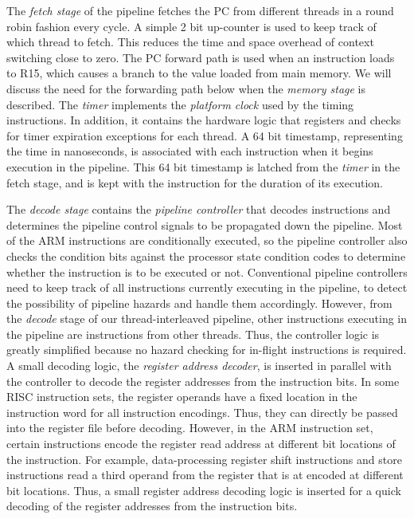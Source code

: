 The \emph{fetch stage} of the pipeline fetches the PC from different threads in a round robin fashion every cycle.
A simple 2 bit up-counter is used to keep track of which thread to fetch.
This reduces the time and space overhead of context switching close to zero. 
The PC forward path is used when an instruction loads to R15, which causes a branch to the value loaded from main memory.  
We will discuss the need for the forwarding path below when the \emph{memory stage} is described.
The \emph{timer} implements the \emph{platform clock} used by the timing instructions.
In addition, it contains the hardware logic that registers and checks for timer expiration exceptions for each thread.
A 64 bit timestamp, representing the time in nanoseconds, is associated with each instruction when it begins execution in the pipeline.
This 64 bit timestamp is latched from the \emph{timer} in the fetch stage, and is kept with the instruction for the duration of its execution. 

The \emph{decode stage} contains the \emph{pipeline controller} that decodes instructions and determines the pipeline control signals to be propagated down the pipeline.
Most of the ARM instructions are conditionally executed, so the pipeline controller also checks the condition bits against the processor state condition codes to determine whether the instruction is to be executed or not.  
Conventional pipeline controllers need to keep track of all instructions currently executing in the pipeline, to detect the possibility of pipeline hazards and handle them accordingly.
However, from the \emph{decode} stage of our thread-interleaved pipeline, other instructions executing in the pipeline are instructions from other threads.
Thus, the controller logic is greatly simplified because no hazard checking for in-flight instructions is required.  
A small decoding logic, the \emph{register address decoder}, is inserted in parallel with the controller to decode the register addresses from the instruction bits.  
In some RISC instruction sets, the register operands have a fixed location in the instruction word for all instruction encodings.
Thus, they can directly be passed into the register file before decoding.   
However, in the ARM instruction set, certain instructions encode the register read address at different bit locations of the instruction.
For example, data-processing register shift instructions and store instructions read a third operand from the register that is at encoded at different bit locations.
Thus, a small register address decoding logic is inserted for a quick decoding of the register addresses from the instruction bits.

